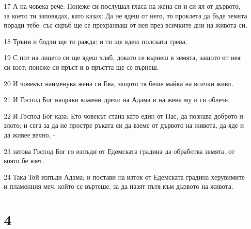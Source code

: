 \par 17 А на човека рече: Понеже си послушал гласа на жена си и си ял от дървото, за което ти заповядах, като казах: Да не ядеш от него, то проклета да бъде земята поради тебе; със скръб ще се прехранваш от нея през всичките дни на живота си.
\par 18 Тръни и бодли ще ти ражда; и ти ще ядеш полската трева.
\par 19 С пот на лицето си ще ядеш хляб, докато се върнеш в земята, защото от нея си взет; понеже си пръст и в пръстта ще се върнеш.
\par 20 И човекът наименува жена си Ева, защото тя беше майка на всички живи.
\par 21 И Господ Бог направи кожени дрехи на Адама и на жена му и ги облече.
\par 22 И Господ Бог каза: Ето човекът стана като един от Нас, да познава доброто и злото; и сега за да не простре ръката си да вземе от дървото на живота, да яде и да живее вечно, -
\par 23 затова Господ Бог го изпъди от Едемската градина да обработва земята, от която бе взет.
\par 24 Така Той изпъди Адама; и постави на изток от Едемската градина херувимите и пламенния меч, който се въртеше, за да пазят пътя към дървото на живота.

\chapter{4}

